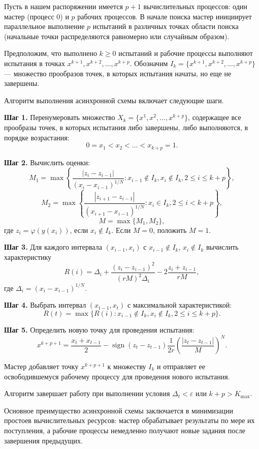 \documentclass[11pt, oneside, a4paper]{article}
\begin{document}
Пусть в нашем распоряжении имеется $p+1$ вычислительных процессов: один мастер (процесс 0) и $p$ рабочих процессов. В начале поиска мастер инициирует параллельное выполнение $p$ испытаний в различных точках области поиска (начальные точки распределяются равномерно или случайным образом).

Предположим, что выполнено $k \geq 0$ испытаний и рабочие процессы выполняют испытания в точках $x^{k+1}, x^{k+2}, \ldots, x^{k+p}$. Обозначим $I_k = \{x^{k+1}, x^{k+2}, \ldots, x^{k+p}\}$ --- множество прообразов точек, в которых испытания начаты, но еще не завершены.

Алгоритм выполнения асинхронной схемы включает следующие шаги.

\textbf{Шаг 1.} Перенумеровать множество $X_k = \{x^1, x^2, \ldots, x^{k+p}\}$, содержащее все прообразы точек, в которых испытания либо завершены, либо выполняются, в порядке возрастания:
\[
0 = x_1 < x_2 < \ldots < x_{k+p} = 1.
\]

\textbf{Шаг 2.} Вычислить оценки:
\[
M_1 = \max\left\{ \frac{|z_i - z_{i-1}|}{(x_i - x_{i-1})^{1/N}} : x_{i-1} \notin I_k, x_i \notin I_k, 2 \leq i \leq k+p \right\},
\]
\[
M_2 = \max\left\{ \frac{|z_{i+1} - z_{i-1}|}{(x_{i+1} - x_{i-1})^{1/N}} : x_i \in I_k, 2 \leq i < k+p \right\},
\]
\[
M = \max\{M_1, M_2\},
\]
где $z_i = \varphi(y(x_i))$, если $x_i \notin I_k$. Если $M = 0$, положить $M = 1$.

\textbf{Шаг 3.} Для каждого интервала $(x_{i-1}, x_i)$ с $x_{i-1} \notin I_k$, $x_i \notin I_k$ вычислить характеристику
\[
R(i) = \Delta_i + \frac{(z_i - z_{i-1})^2}{(rM)^2\Delta_i} - 2\frac{z_i + z_{i-1}}{rM},
\]
где $\Delta_i = (x_i - x_{i-1})^{1/N}$.

\textbf{Шаг 4.} Выбрать интервал $(x_{t-1}, x_t)$ с максимальной характеристикой:
\[
R(t) = \max\{ R(i) : x_{i-1} \notin I_k, x_i \notin I_k, 2 \leq i \leq k+p \}.
\]

\textbf{Шаг 5.} Определить новую точку для проведения испытания:
\[
x^{k+p+1} = \frac{x_t + x_{t-1}}{2} - \operatorname{sign}(z_t - z_{t-1}) \frac{1}{2r} \left( \frac{|z_t - z_{t-1}|}{M} \right)^N.
\]

Мастер добавляет точку $x^{k+p+1}$ к множеству $I_k$ и отправляет ее освободившемуся рабочему процессу для проведения нового испытания.

Алгоритм завершает работу при выполнении условия $\Delta_t < \varepsilon$ или $k+p > K_{\max}$.

Основное преимущество асинхронной схемы заключается в минимизации простоев вычислительных ресурсов: мастер обрабатывает результаты по мере их поступления, а рабочие процессы немедленно получают новые задания после завершения предыдущих.
\end{document}
